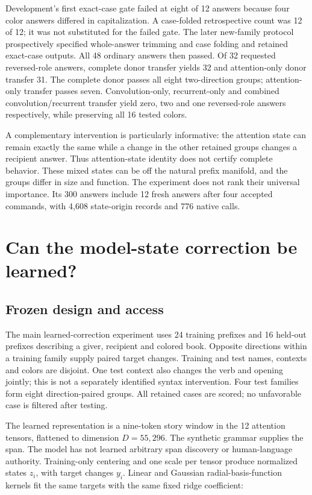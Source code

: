 \documentclass[11pt,letterpaper]{article}
\begin{document}
Development's first exact-case gate failed at eight of 12 answers because four color answers differed in capitalization. A case-folded retrospective count was 12 of 12; it was not substituted for the failed gate. The later new-family protocol prospectively specified whole-answer trimming and case folding and retained exact-case outputs. All 48 ordinary answers then passed. Of 32 requested reversed-role answers, complete donor transfer yields 32 and attention-only donor transfer 31. The complete donor passes all eight two-direction groups; attention-only transfer passes seven. Convolution-only, recurrent-only and combined convolution/recurrent transfer yield zero, two and one reversed-role answers respectively, while preserving all 16 tested colors.

A complementary intervention is particularly informative: the attention state can remain exactly the same while a change in the other retained groups changes a recipient answer. Thus attention-state identity does not certify complete behavior. These mixed states can be off the natural prefix manifold, and the groups differ in size and function. The experiment does not rank their universal importance. Its 300 answers include 12 fresh answers after four accepted commands, with 4,608 state-origin records and 776 native calls.

\section{Can the model-state correction be learned?}

\subsection{Frozen design and access}

The main learned-correction experiment uses 24 training prefixes and 16 held-out prefixes describing a giver, recipient and colored book. Opposite directions within a training family supply paired target changes. Training and test names, contexts and colors are disjoint. One test context also changes the verb and opening jointly; this is not a separately identified syntax intervention. Four test families form eight direction-paired groups. All retained cases are scored; no unfavorable case is filtered after testing.

The learned representation is a nine-token story window in the 12 attention tensors, flattened to dimension \(D=55{,}296\). The synthetic grammar supplies the span. The model has not learned arbitrary span discovery or human-language authority. Training-only centering and one scale per tensor produce normalized states \(z_i\), with target changes \(y_i\). Linear and Gaussian radial-basis-function kernels fit the same targets with the same fixed ridge coefficient:
\end{document}
